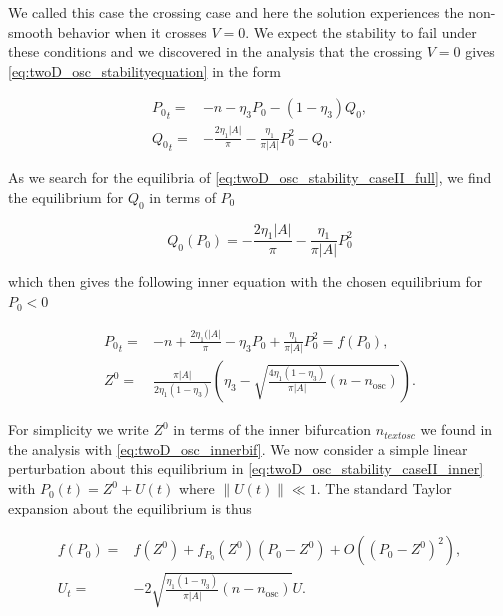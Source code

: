 We called this case the crossing case and here the solution experiences the non-smooth behavior when it crosses $V=0$. We expect the stability to fail under these conditions and we discovered in the analysis that the crossing $V=0$ gives \eqref{eq:twoD_osc_stabilityequation} in the form

\begin{equation}\label{eq:twoD_osc_stability_caseII_full}
\begin{aligned}
{P_0}_t =& -n-\eta_3 P_0-(1-\eta_3)Q_0,\\
{Q_0}_t =& -\frac{2\eta_1|A|}{\pi}-\frac{\eta_1}{\pi |A|}P_0^2-Q_0.
\end{aligned}
\end{equation}

As we search for the equilibria of \eqref{eq:twoD_osc_stability_caseII_full}, we find the equilibrium for $Q_0$ in terms of $P_0$  

\begin{equation*}
Q_0(P_0)=-\frac{2\eta_1|A|}{\pi}-\frac{\eta_1}{\pi |A|}P_0^2
\end{equation*}

which then gives the following inner equation with the chosen equilibrium for $P_0<0$

\begin{equation}\label{eq:twoD_osc_stability_caseII_inner}
\begin{aligned}
{P_0}_t=&-n+\frac{2\eta_1(|A|}{\pi}-\eta_3 P_0+\frac{\eta_1}{\pi |A|}P_0^2=f(P_0),\\
Z^0=&\frac{\pi |A|}{2\eta_1(1-\eta_3)}\left(\eta_3-\sqrt{\frac{4\eta_1(1-\eta_3)}{\pi|A|}(n-n_{\text{osc}})}\right).
\end{aligned}
\end{equation}

For simplicity we write $Z^0$ in terms of the inner bifurcation $n_{text{osc}}$ we found in the analysis with \eqref{eq:twoD_osc_innerbif}. We now consider a simple linear perturbation about this equilibrium in \eqref{eq:twoD_osc_stability_caseII_inner} with $P_0(t)=Z^0+U(t)$ where $\lVert U(t)\rVert\ll 1$. The standard Taylor expansion about the equilibrium is thus

\begin{equation}\label{eqLtwoD_osc_stability_caseII_perturb}
\begin{aligned}
f(P_0)=&f(Z^0)+f_{P_0}(Z^0)(P_0-Z^0)+O((P_0-Z^0)^2),\\
U_t=&- 2\sqrt{\frac{\eta_1(1-\eta_3)}{\pi|A|}(n-n_{\text{osc}})}U.
\end{aligned}
\end{equation}

